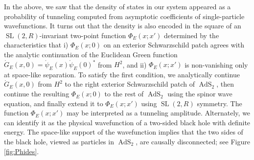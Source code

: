 \documentclass[12pt]{article}
\newcommand{\RR}{\mathbb{R}}
\DeclareMathOperator{\tSL}{\widetilde{\mathrm{SL}}}
\DeclareMathOperator{\tAdS}{\widetilde{AdS}}
\DeclareMathOperator{\HH}{H}
\def\widetilde#1{#1}%
\def\HH{H}
\def\RR{R}
\begin{document}
In the above, we saw that the density of states in our system appeared as a probability of tunneling computed from asymptotic coefficients of single-particle wavefunctions. It turns out that the density is also encoded in the square of an $\tSL(2,\RR)$-invariant two-point function $\Phi_E(x;x')$ determined by the characteristics that i) $\Phi_E(x;0)$ on an exterior Schwarzschild patch agrees with the analytic continuation of the Euclidean Green function $\mathring{G}_E(x, 0)=\mathring{\psi}_E(x)\mathring{\psi}_E(0)^*$ from $\HH^2$, and ii) $\Phi_E(x;x')$ is non-vanishing only at space-like separation. To satisfy the first condition, we analytically continue $\mathring{G}_{E}(x,0)$ from $\HH^2$ to the right exterior Schwarzschild patch of $\tAdS_2$, then continue the resulting $\Phi_E(x;0)$ to the rest of $\tAdS_2$ using the spinor wave equation, and finally extend it to $\Phi_E(x;x')$ using $\tSL(2,\RR)$ symmetry. The function $\Phi_E(x;x')$ may be interpreted as a tunneling amplitude. Alternately, we can identify it as the physical wavefunction of a two-sided black hole with definite energy. The space-like support of the wavefunction implies that the two sides of the black hole, viewed as particles in $\tAdS_2$, are causally disconnected; see Figure \ref{fig:Phides}.
\end{document}
